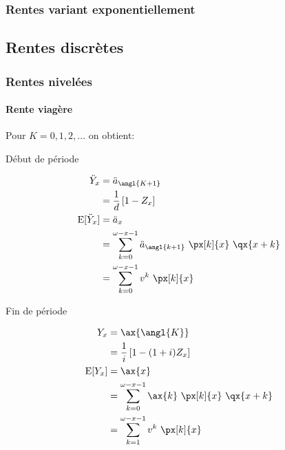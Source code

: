 \documentclass[10pt, french]{article}
\begin{document}
\begin{multicols*}{3}
\subsubsection*{\textcolor{amber(sae/ece)}{Rentes variant exponentiellement}}


\subsection*{Rentes discrètes}

\subsubsection*{\textcolor{amber(sae/ece)}{Rentes nivelées}}

\paragraph{Rente viagère}
Pour $K = 0, 1, 2,\dots$ on obtient:
\setlength{\mathindent}{-1cm}

\begin{minipage}[t]{0.5\columnwidth}
\begin{center}
Début de période
\end{center}
\begin{align*}
	\ddot{Y}_{x}
	&=	\ddot{a}_{\angl{K + 1}}\\
	&=	\frac{1}{d} \left[ 1 - Z_{x} \right]	\\
	\text{E}[\ddot{Y}_{x}]	
	&=	\ddot{a}_{x}	\\
	&=	\sum_{k = 0}^{\omega - x - 1} \ddot{a}_{\angl{k + 1}} \ \px[k]{x} \ \qx{x + k}	\\
	&=	\sum_{k = 0}^{\omega - x - 1} v^{k} \ \px[k]{x}	
\end{align*}
\end{minipage}
\begin{minipage}[t]{0.5\columnwidth}
\begin{center}
Fin de période
\end{center}
\begin{align*}
	Y_{x}
	&=	\ax{\angl{K}}
\\
	&=	\frac{1}{i} \left[ 1 - (1 + i) Z_{x} \right]	\\
	\text{E}[Y_{x}]	
	&=	\ax{x}	\\
	&=	\sum_{k = 0}^{\omega - x - 1} \ax{k} \ \px[k]{x} \ \qx{x + k}	\\
	&=	\sum_{k = 1}^{\omega - x - 1} v^{k} \ \px[k]{x}
\end{align*}
\end{minipage}


\end{multicols*}
\end{document}

